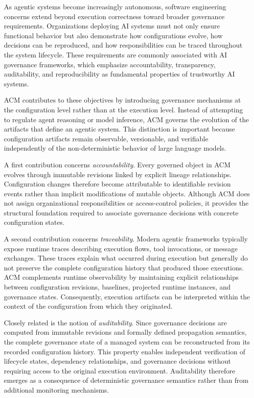 \documentclass[10pt]{article}
\begin{document}
As agentic systems become increasingly autonomous, software engineering concerns extend beyond execution correctness toward broader governance requirements. Organizations deploying AI systems must not only ensure functional behavior but also demonstrate how configurations evolve, how decisions can be reproduced, and how responsibilities can be traced throughout the system lifecycle. These requirements are commonly associated with AI governance frameworks, which emphasize accountability, transparency, auditability, and reproducibility as fundamental properties of trustworthy AI systems.

ACM contributes to these objectives by introducing governance mechanisms at the configuration level rather than at the execution level. Instead of attempting to regulate agent reasoning or model inference, ACM governs the evolution of the artifacts that define an agentic system. This distinction is important because configuration artifacts remain observable, versionable, and verifiable independently of the non-deterministic behavior of large language models.

A first contribution concerns \emph{accountability}. Every governed object in ACM evolves through immutable revisions linked by explicit lineage relationships. Configuration changes therefore become attributable to identifiable revision events rather than implicit modifications of mutable objects. Although ACM does not assign organizational responsibilities or access-control policies, it provides the structural foundation required to associate governance decisions with concrete configuration states.

A second contribution concerns \emph{traceability}. Modern agentic frameworks typically expose runtime traces describing execution flows, tool invocations, or message exchanges. These traces explain what occurred during execution but generally do not preserve the complete configuration history that produced those executions. ACM complements runtime observability by maintaining explicit relationships between configuration revisions, baselines, projected runtime instances, and governance states. Consequently, execution artifacts can be interpreted within the context of the configuration from which they originated.

Closely related is the notion of \emph{auditability}. Since governance decisions are computed from immutable revisions and formally defined propagation semantics, the complete governance state of a managed system can be reconstructed from its recorded configuration history. This property enables independent verification of lifecycle states, dependency relationships, and governance decisions without requiring access to the original execution environment. Auditability therefore emerges as a consequence of deterministic governance semantics rather than from additional monitoring mechanisms.
\end{document}
